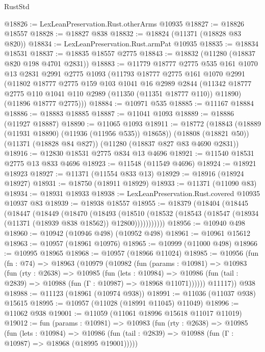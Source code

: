 \begin{lexlean}{RustStd}
\begin{coremodule}
{\begin{coremodule}
{{{{{{{{{{{{{{{{{{{{{{{{{{{{{{{{{@18826 := LexLeanPreservation.Rust.otherArms @10935
@18827 := @18826 @18557
@18828 := @18827 @838
@18832 := @18824 (@11371 (@18828 @83 @820))
@18834 := LexLeanPreservation.Rust.armPat @10935
@18835 := @18834 @18531
@18837 := @18835 @18557 @2775
@18843 := @18832 (@11280 (@18837 @820 @198 @4701 @2831))
@18883 := @11779
    @18777
    @2775
    @535
    @161
    @1070
    @13
    @2831
    @2991
    @2775
    @1093
    (@11793
      @18777
      @2775
      @161
      @1070
      @2991
      (@11802
        @18777
        @2775
        @159
        @103
        @1041
        @16
        @2989
        @2844
        (@11342 @18777 @2775 @110 @1041 @110 @2989 (@11350 (@11351 @18777 @110)) @11890)
        (@11896 @18777 @2775)))
@18884 := @10971 @535
@18885 := @11167 @18884
@18886 := @18883 @18885
@18887 := @11041 @1093
@18889 := @18886 (@11927 @18887)
@18890 := @11065 @1093
@18911 := @18772
    (@18843 (@18889 (@11931 @18890) (@11936 (@11956 @535)) @18658))
    (@18808 (@18821 @50))
    (@11371 (@18828 @84 @827))
    (@11280 (@18837 @827 @83 @4690 @2831))
@18916 := @12830 @18531 @2775 @834 @13 @4696
@18921 := @11540 @18531 @2775 @13 @833 @4696
@18923 := @11548 (@11549 @4696)
@18924 := @18921 @18923
@18927 := @11371 (@11554 @833 @13)
@18929 := @18916 (@18924 @18927)
@18931 := @18750 (@18911 @18929)
@18933 := @11371 (@11090 @83)
@18934 := @18931 @18933
@18938 := LexLeanPreservation.Rust.covered @10935 @10937 @83
@18939 := @18938 @18557
@18955 := @18379
    (@18404
      (@18445
        (@18447
          (@18449
            (@18470
              (@18493
                (@18510
                  (@18532 (@18543 (@18547 (@18934 (@11371 (@18939 @838 @18562)) @12800)))))))))))
@18956 := @10940 @498
@18960 := @10942 (@10946 @498) (@10952 @498)
@18961 := @10961 @15612
@18963 := @10957 (@18961 @10976)
@18965 := @10999 (@11000 @498)
@18966 := @10995 @18965
@18968 := @10957 (@18966 @11024)
@18985 := @10956
    (fun (fn : @74) =>
    @18963
      (@10979
        (@10982
          (fun (params : @10981) =>
          @10983
            (fun (rty : @2638) =>
            @10985
              (fun (lets : @10984) =>
              @10986 (fun (tail : @2839) => @10988 (fun (Γ : @10987) => @18968 @11071))))))
        @11117))
    @938
@18988 := @11123 (@18961 (@10974 @938))
@18991 := @11036 (@11037 @938) @15615
@18995 := @10957 (@11028 (@18991 @11045) @11049)
@18996 := @11062 @938
@19001 := @11059 (@11061 @18996 @15618 @11017 @11019)
@19012 := fun (params : @10981) =>
  @10983
    (fun (rty : @2638) =>
    @10985
      (fun (lets : @10984) =>
      @10986 (fun (tail : @2839) => @10988 (fun (Γ : @10987) => @18968 (@18995 @19001)))))
}}}}}}}}}}}}}}}}}}}}}}}}}}}}}}}}}
\end{coremodule}}
\end{coremodule}
\end{lexlean}
